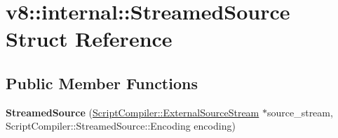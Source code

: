 \hypertarget{structv8_1_1internal_1_1_streamed_source}{}\section{v8\+:\+:internal\+:\+:Streamed\+Source Struct Reference}
\label{structv8_1_1internal_1_1_streamed_source}
\subsection*{Public Member Functions}
\begin{DoxyCompactItemize}
\item 
{\bfseries Streamed\+Source} (\hyperlink{classv8_1_1_script_compiler_1_1_external_source_stream}{Script\+Compiler\+::\+External\+Source\+Stream} $\ast$source\+\_\+stream, Script\+Compiler\+::\+Streamed\+Source\+::\+Encoding encoding)\hypertarget{structv8_1_1internal_1_1_streamed_source_ab2df012f40943d2c9184ea6daada7585}{}\label{structv8_1_1internal_1_1_streamed_source_ab2df012f40943d2c9184ea6daada7585}

\end{DoxyCompactItemize}
